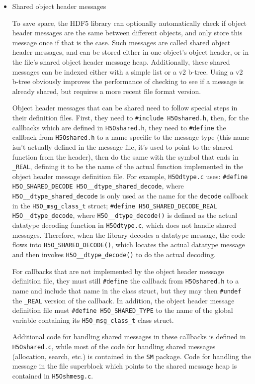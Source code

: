 \begin{itemize}
    \item Shared object header messages

To save space, the HDF5 library can optionally automatically check if object header messages are the same between different objects, and only store this message once if that is the case. Such messages are called shared object header messages, and can be stored either in one object's object header, or in the file's shared object header message heap. Additionally, these shared messages can be indexed either with a simple list or a v2 b-tree. Using a v2 b-tree obviously improves the performance of checking to see if a message is already shared, but requires a more recent file format version.

Object header messages that can be shared need to follow special steps in their definition files. First, they need to \texttt{\#include H5Oshared.h}, then, for the callbacks which are defined in \texttt{H5Oshared.h}, they need to \texttt{\#define} the callback from \texttt{H5Oshared.h} to a name specific to the message type (this name isn't actually defined in the message file, it's used to point to the shared function from the header), then do the same with the symbol that ends in \texttt{\_REAL}, defining it to be the name of the actual function implemented in the object header message definition file. For example, \texttt{H5Odtype.c} uses: \texttt{\#define H5O\_SHARED\_DECODE H5O\_\_dtype\_shared\_decode}, where \texttt{H5O\_\_dtype\_shared\_decode} is only used as the name for the \texttt{decode} callback in the \texttt{H5O\_msg\_class\_t} struct; \texttt{\#define H5O\_SHARED\_DECODE\_REAL H5O\_\_dtype\_decode}, where \texttt{H5O\_\_dtype\_decode()} is defined as the actual datatype decoding function in \texttt{H5Odtype.c}, which does not handle shared messages. Therefore, when the library decodes a datatype message, the code flows into \texttt{H5O\_SHARED\_DECODE()}, which locates the actual datatype message and then invokes \texttt{H5O\_\_dtype\_decode()} to do the actual decoding.

For callbacks that are not implemented by the object header message definition file, they must still \texttt{\#define} the callback from \texttt{H5Oshared.h} to a name and include that name in the class struct, but they may then \texttt{\#undef} the \texttt{\_REAL} version of the callback. In addition, the object header message definition file must \texttt{\#define H5O\_SHARED\_TYPE} to the name of the global variable containing its \texttt{H5O\_msg\_class\_t} class struct.

Additional code for handling shared messages in these callbacks is defined in \texttt{H5Oshared.c}, while most of the code for handling shared messages (allocation, search, etc.) is contained in the \texttt{SM} package. Code for handling the message in the file superblock which points to the shared message heap is contained in \texttt{H5Oshmesg.c}.



\end{itemize}

